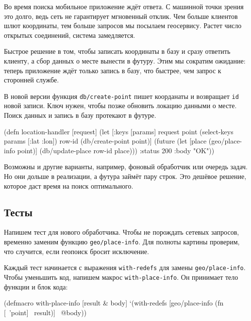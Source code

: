 Во время поиска мобильное приложение ждёт ответа. С машинной точки зрения это
долго, ведь сеть не гарантирует мгновенный отклик. Чем больше клиентов шлют
координаты, тем больше запросов мы посылаем геосервису. Растет число
открытых соединений, система замедляется.


Быстрое решение в том, чтобы записать координаты в базу и сразу ответить
клиенту, а сбор данных о месте вынести в футуру. Этим мы сократим ожидание:
теперь приложение ждёт только запись в базу, что быстрее, чем запрос к сторонней
службе.

В новой версии функция \verb|db/create-point| пишет коорданаты и возвращает
\verb|id| новой записи. Ключ нужен, чтобы позже обновить локацию данными о
месте. Поиск данных и запись в базу протекают в футуре.

\begin{english}
  \begin{clojure}
(defn location-handler
  [request]
  (let [{:keys [params]} request
        point (select-keys params [:lat :lon])
        row-id (db/create-point point)]
    (future
      (let [place (geo/place-info point)]
        (db/update-place row-id place)))
    {:status 200 :body "OK"}))
  \end{clojure}
\end{english}

Возможны и другие варианты, например, фоновый обработчик или очередь задач. Но
они дольше в реализации, а футура займёт пару строк. Это дешёвое решение,
которое даст время на поиск оптимального.

\subsection{Тесты}


Напишем тест для нового обработчика. Чтобы не порождать сетевых запросов,
временно заменим функцию \verb|geo/place-info|. Для полноты картины проверим,
что случится, если геопоиск бросит исключение.

Каждый тест начинается с выражения \verb|with-redefs| для замены
\verb|geo/place-info|. Чтобы уменьшить код, напишем макрос
\verb|with-place-info|. Он принимает тело функции и блок кода:

\begin{english}
  \begin{clojure}
(defmacro with-place-info
  [result & body]
  `(with-redefs [geo/place-info
                 (fn [~'point] ~result)]
     ~@body))
  \end{clojure}
\end{english}

